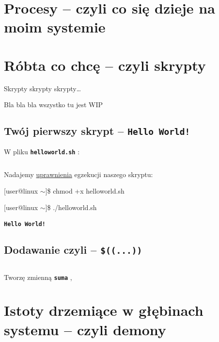 \documentclass[11pt, a4paper]{article}
\makeatletter
\newcommand{\ttbf}[1]{
    \texttt{\textbf{#1}}
}
\newenvironment{console1}[1][$\sim$]
{
    \begin{tcolorbox}
    \ttfamily
    \fontseries{b}
    \selectfont
    {[}user@linux #1{]}\$ } {
    
    \end{tcolorbox}

}
\makeatother
\begin{document}
\section{Procesy -- czyli co się dzieje na moim systemie}
\label{sec:process}

\section{Róbta co chcę -- czyli skrypty}

Skrypty skrypty skrypty\dots

Bla bla bla wszystko tu jest WIP

\subsection{Twój pierwszy skrypt -- \ttbf{Hello World!}}

W pliku \ttbf{helloworld.sh}:

\begin{minipage}[t]{0.5\textwidth}
\inputminted{bash}{skrypty/helloworld.sh}
\end{minipage}

Nadajemy \hyperref[sec:perms]{uprawnienia} egzekucji naszego skryptu:

\begin{console1}
    chmod +x helloworld.sh
\end{console1}


\begin{console1}
    ./helloworld.sh
\end{console1}

\ttbf{Hello World!}

\subsection{Dodawanie czyli -- \ttbf{\$((...))}}

\begin{minipage}[t]{0.49\textwidth}
    \inputminted{bash}{skrypty/dodawanie.sh}
\end{minipage}\hfill
\begin{minipage}[t]{0.45\textwidth}
    Tworzę zmienną \ttbf{suma},

\end{minipage}

\section{Istoty drzemiące w głębinach systemu -- czyli demony}
\end{document}
